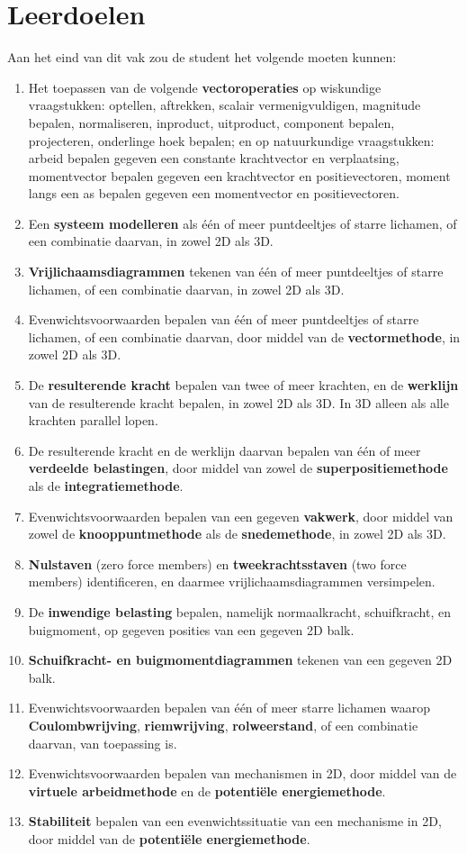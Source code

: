 \documentclass{article}
\begin{document}
\section{Leerdoelen}
Aan het eind van dit vak zou de student het volgende moeten kunnen:
\begin{enumerate}
\item Het toepassen van de volgende \textbf{vectoroperaties} op wiskundige vraagstukken: optellen, aftrekken, scalair vermenigvuldigen, magnitude bepalen, normaliseren, inproduct, uitproduct, component bepalen, projecteren, onderlinge hoek bepalen; en op natuurkundige vraagstukken: arbeid bepalen gegeven een constante krachtvector en verplaatsing, momentvector bepalen gegeven een krachtvector en positievectoren, moment langs een as bepalen gegeven een momentvector en positievectoren.
\item Een \textbf{systeem modelleren} als één of meer puntdeeltjes of starre lichamen, of een combinatie daarvan, in zowel 2D als 3D.
\item \textbf{Vrijlichaamsdiagrammen} tekenen van één of meer puntdeeltjes of starre lichamen, of een combinatie daarvan, in zowel 2D als 3D.
\item Evenwichtsvoorwaarden bepalen van één of meer puntdeeltjes of starre lichamen, of een combinatie daarvan, door middel van de \textbf{vectormethode}, in zowel 2D als 3D.
\item De \textbf{resulterende kracht} bepalen van twee of meer krachten, en de \textbf{werklijn} van de resulterende kracht bepalen, in zowel 2D als 3D. In 3D alleen als alle krachten parallel lopen.
\item De resulterende kracht en de werklijn daarvan bepalen van één of meer \textbf{verdeelde belastingen}, door middel van zowel de \textbf{superpositiemethode} als de \textbf{integratiemethode}.
\item Evenwichtsvoorwaarden bepalen van een gegeven \textbf{vakwerk}, door middel van zowel de \textbf{knooppuntmethode} als de \textbf{snedemethode}, in zowel 2D als 3D.
\item \textbf{Nulstaven} (zero force members) en \textbf{tweekrachtsstaven} (two force members) identificeren, en daarmee vrijlichaamsdiagrammen versimpelen.
\item De \textbf{inwendige belasting} bepalen, namelijk normaalkracht, schuifkracht, en buigmoment, op gegeven posities van een gegeven 2D balk.
\item \textbf{Schuifkracht- en buigmomentdiagrammen} tekenen van een gegeven 2D balk.
\item Evenwichtsvoorwaarden bepalen van één of meer starre lichamen waarop \textbf{Coulombwrijving}, \textbf{riemwrijving}, \textbf{rolweerstand}, of een combinatie daarvan, van toepassing is.
\item Evenwichtsvoorwaarden bepalen van mechanismen in 2D, door middel van de \textbf{virtuele arbeidmethode} en de \textbf{potentiële energiemethode}.
\item \textbf{Stabiliteit} bepalen van een evenwichtssituatie van een mechanisme in 2D, door middel van de \textbf{potentiële energiemethode}.


\end{enumerate}
\end{document}
